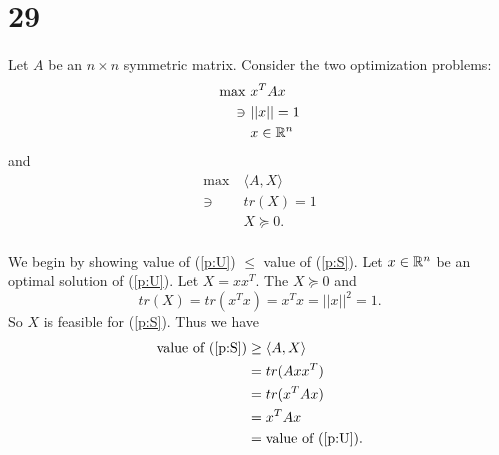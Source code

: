 \documentclass[letterpaper,12pt,oneside,onecolumn]{article}
\begin{document}
\section*{29}
\paragraph{}
Let $A$ be an $n \times n$ symmetric matrix. Consider the two optimization problems:
\begin{align}
\max\ &x^TAx \nonumber \\
\ni\ &||x|| = 1\label{p:U}\\
 &x \in \mathbb{R}^n\nonumber
\end{align}
and
\begin{align}
\max\ &\langle A, X \rangle \nonumber\\
\ni\ &tr(X) = 1 \label{p:S} \\
&X \succcurlyeq 0. \nonumber
\end{align}
\paragraph{}
We begin by showing value of (\ref{p:U}) $\leq$ value of (\ref{p:S}). Let $x \in \mathbb{R}^n$ be an optimal solution of (\ref{p:U}). Let $X = xx^T$. The $X \succcurlyeq 0$ and $$tr(X) = tr(x^Tx) = x^Tx = ||x||^2 = 1.$$
So $X$ is feasible for (\ref{p:S}). Thus we have
\begin{align*}
\text{value of (\ref{p:S})} &\geq \langle A, X \rangle \\
&= tr(Axx^T)  \\
&= tr(x^TAx) \\
&= x^TAx \\
&= \text{value of (\ref{p:U})}.
\end{align*}
\end{document}
